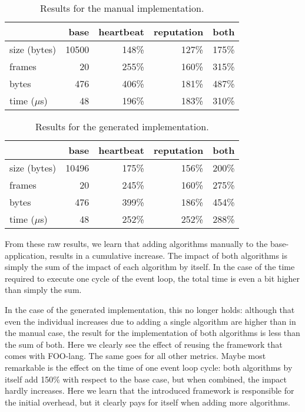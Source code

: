 \documentclass[conference]{IEEEtran}
\begin{document}
\begin{table}[H]
  \centering
  \begin{tabular}{lrrrr}
  \hline
      & base & heartbeat & reputation & both\\
  \hline
  size (bytes) & 10500 & 148\% & 127\% & 175\%\\
  frames & 20 & 255\% & 160\% & 315\%\\
  bytes & 476 & 406\% & 181\% & 487\%\\
  time ($\mu$s) & 48 & 196\% & 183\% & 310\%\\
  \hline
  \end{tabular}
  \caption{Results for the manual implementation.}
  \label{tbl:manual}
\end{table}

\begin{table}[H]
  \centering
  \begin{tabular}{lrrrr}
  \hline
         & base & heartbeat & reputation & both\\
  \hline
  size (bytes) & 10496 & 175\% & 156\% & 200\%\\
  frames & 20 & 245\% & 160\% & 275\%\\
  bytes & 476 & 399\% & 186\% & 454\%\\
  time ($\mu$s) & 48 & 252\% & 252\% & 288\%\\
  \hline
  \end{tabular}
  \caption{Results for the generated implementation.}
  \label{tbl:generated}
\end{table}

From these raw results, we learn that adding algorithms manually to the
base-application, results in a cumulative increase. The impact of both
algorithms is simply the sum of the impact of each algorithm by itself. In the
case of the time required to execute one cycle of the event loop, the total
time is even a bit higher than simply the sum.

In the case of the generated implementation, this no longer holds: although
that even the individual increases due to adding a single algorithm are higher
than in the manual case, the result for the implementation of both algorithms
is less than the sum of both. Here we clearly see the effect of reusing the
framework that comes with FOO-lang. The same goes for all other metrics. Maybe
most remarkable is the effect on the time of one event loop cycle: both
algorithms by itself add 150\% with respect to the base case, but when
combined, the impact hardly increases. Here we learn that the introduced
framework is responsible for the initial overhead, but it clearly pays for
itself when adding more algorithms.
\end{document}
